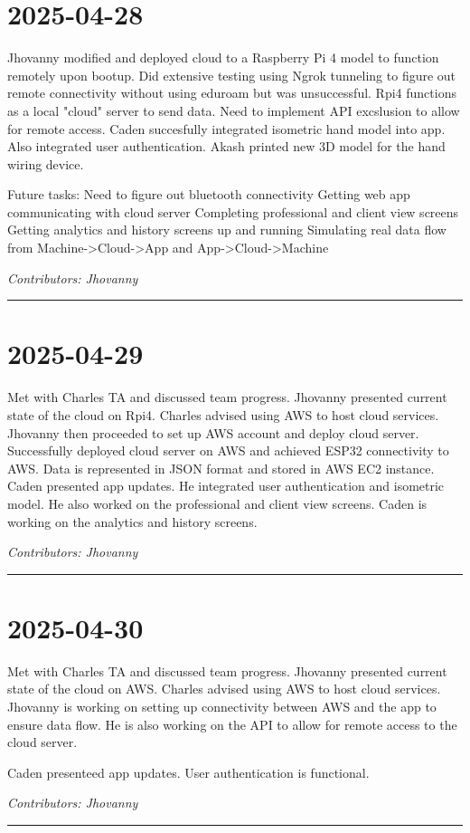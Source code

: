 \documentclass[12pt]{article}
\begin{document}
\section*{2025-04-28}
Jhovanny modified and deployed cloud to a Raspberry Pi 4 model to function remotely upon bootup. Did extensive testing using Ngrok tunneling to figure out remote connectivity without using eduroam but was unsuccessful. Rpi4 functions as a local "cloud" server to send data. Need to implement API excslusion to allow for remote access.
Caden succesfully integrated isometric hand model into app. Also integrated user authentication. 
Akash printed new 3D model for the hand wiring device.

Future tasks:
Need to figure out bluetooth connectivity
Getting web app communicating with cloud server
Completing professional and client view screens
Getting analytics and history screens up and running
Simulating real data flow from Machine->Cloud->App and App->Cloud->Machine

\vspace{1em}
\noindent\textit{Contributors: Jhovanny}
\vspace{1em}
\hrule

\section*{2025-04-29}
Met with Charles TA and discussed team progress. Jhovanny presented current state of the cloud on Rpi4. Charles advised using AWS to host cloud services.
Jhovanny then proceeded to set up AWS account and deploy cloud server. Successfully deployed cloud server on AWS and achieved ESP32 connectivity to AWS. Data is represented in JSON format and stored in AWS EC2 instance.
Caden presented app updates. He integrated user authentication and isometric model. He also worked on the professional and client view screens. Caden is working on the analytics and history screens.

\vspace{1em}
\noindent\textit{Contributors: Jhovanny}
\vspace{1em}
\hrule

\section*{2025-04-30}
Met with Charles TA and discussed team progress. Jhovanny presented current state of the cloud on AWS. Charles advised using AWS to host cloud services.
Jhovanny is working on setting up connectivity between AWS and the app to ensure data flow. He is also working on the API to allow for remote access to the cloud server.

Caden presenteed app updates. User authentication is functional. 

\vspace{1em}
\noindent\textit{Contributors: Jhovanny}
\vspace{1em}
\hrule
\end{document}
